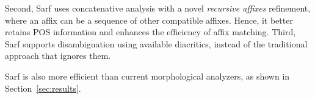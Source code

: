 \documentclass[11pt]{article}
\begin{document}
Second, 
Sarf uses concatenative analysis with a novel %
{\em recursive affixes} refinement,
where an affix can be a sequence of other compatible affixes.
Hence, it better retains
POS information  
and enhances the 
efficiency of affix matching. 
Third, Sarf supports disambiguation using 
available diacritics, instead of the traditional approach that ignores them.

Sarf is also more efficient than current morphological analyzers, 
as shown in Section~\ref{sec:results}.


\end{document}
